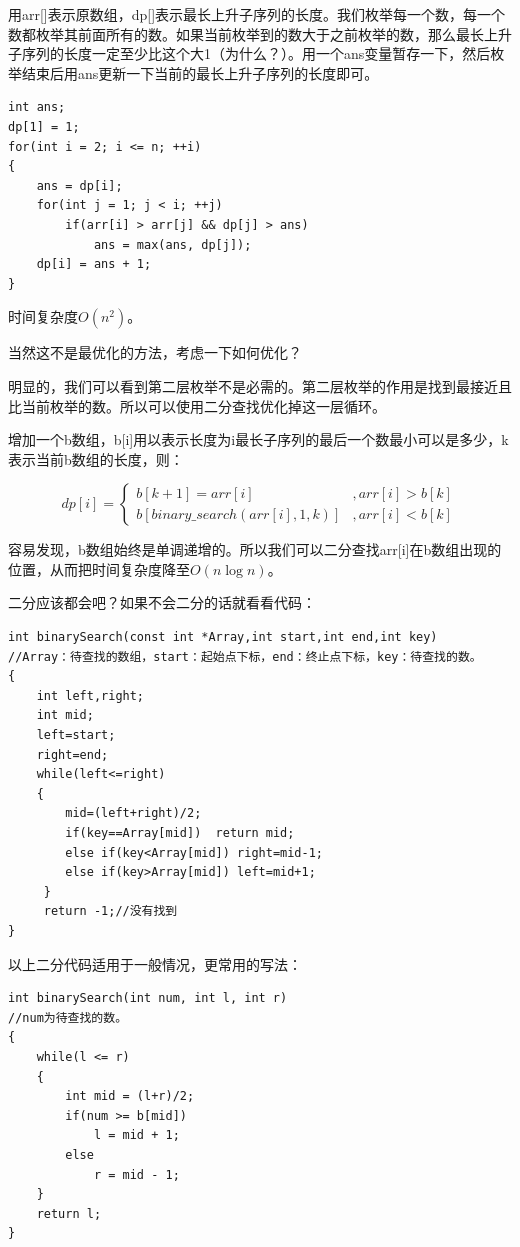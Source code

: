 \documentclass{article}
\theoremstyle{nonumberplain}
\begin{document}
用arr[]表示原数组，dp[]表示最长上升子序列的长度。我们枚举每一个数，每一个数都枚举其前面所有的数。如果当前枚举到的数大于之前枚举的数，那么最长上升子序列的长度一定至少比这个大1（为什么？）。用一个ans变量暂存一下，然后枚举结束后用ans更新一下当前的最长上升子序列的长度即可。
\begin{verbatim}
int ans;  
dp[1] = 1;  
for(int i = 2; i <= n; ++i)  
{
    ans = dp[i];  
    for(int j = 1; j < i; ++j)
        if(arr[i] > arr[j] && dp[j] > ans)  
            ans = max(ans, dp[j]);  
    dp[i] = ans + 1;
}
\end{verbatim}

时间复杂度$O(n^2)$。

当然这不是最优化的方法，考虑一下如何优化？

明显的，我们可以看到第二层枚举不是必需的。第二层枚举的作用是找到最接近且比当前枚举的数。所以可以使用二分查找优化掉这一层循环。

增加一个b数组，b[i]用以表示长度为i最长子序列的最后一个数最小可以是多少，k表示当前b数组的长度，则：

\begin{equation*}
	dp[i]=\begin{cases}
		b[k+1]=arr[i]                  & , arr[i]>b[k] \\
		b[binary\_search(arr[i],1,k)] & , arr[i]<b[k]
	\end{cases}
\end{equation*}

容易发现，b数组始终是单调递增的。所以我们可以二分查找arr[i]在b数组出现的位置，从而把时间复杂度降至$O(n\log n)$。

二分应该都会吧？如果不会二分的话就看看代码：

\begin{verbatim}
int binarySearch(const int *Array,int start,int end,int key)
//Array：待查找的数组，start：起始点下标，end：终止点下标，key：待查找的数。
{
    int left,right;
    int mid;
    left=start;
    right=end;
    while(left<=right)
    {
        mid=(left+right)/2;
        if(key==Array[mid])  return mid;
        else if(key<Array[mid]) right=mid-1;
        else if(key>Array[mid]) left=mid+1;    
     }
     return -1;//没有找到
}
\end{verbatim}

以上二分代码适用于一般情况，更常用的写法：
\begin{verbatim}
int binarySearch(int num, int l, int r)
//num为待查找的数。
{    
    while(l <= r)    
    {    
        int mid = (l+r)/2;    
        if(num >= b[mid])    
            l = mid + 1;    
        else  
            r = mid - 1;    
    }    
    return l;
}
\end{verbatim}
\end{document}
